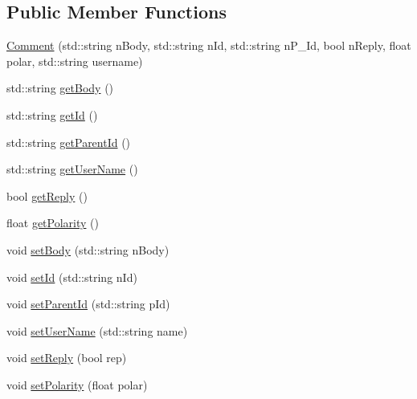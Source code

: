 \subsection*{Public Member Functions}
\begin{DoxyCompactItemize}
\item 
\hyperlink{class_comment_aa72817b1d59ba65d90a924e0ca056bee}{Comment} (std\+::string n\+Body, std\+::string n\+Id, std\+::string n\+P\+\_\+\+Id, bool n\+Reply, float polar, std\+::string username)
\item 
std\+::string \hyperlink{class_comment_acd202bf4ef1b23aa8a11cae4af4b44b4}{get\+Body} ()
\item 
std\+::string \hyperlink{class_comment_ab46d905afeb79abd5caa6434c84020d8}{get\+Id} ()
\item 
std\+::string \hyperlink{class_comment_a2903eea46f56ee796715e4989d1745f1}{get\+Parent\+Id} ()
\item 
std\+::string \hyperlink{class_comment_a192b820f7ad3d8065437436eae4408c5}{get\+User\+Name} ()
\item 
bool \hyperlink{class_comment_a89cfdb81dd327cf01d4f0fbb1d6f3c44}{get\+Reply} ()
\item 
float \hyperlink{class_comment_ab8f639d0d25165885bfbf09d3469f2b0}{get\+Polarity} ()
\item 
void \hyperlink{class_comment_abadebf70476d2ac212154fd52df103e7}{set\+Body} (std\+::string n\+Body)
\item 
void \hyperlink{class_comment_abb43aa20506c1d6cdb54c6b62e2b0d9d}{set\+Id} (std\+::string n\+Id)
\item 
void \hyperlink{class_comment_ac08d6d07afad5663c1d6c5886c7be333}{set\+Parent\+Id} (std\+::string p\+Id)
\item 
void \hyperlink{class_comment_a9e47b4560fb5d4e8e9e254a23622c6d5}{set\+User\+Name} (std\+::string name)
\item 
void \hyperlink{class_comment_ae6c057526fb2d3b789dfe99a0450f134}{set\+Reply} (bool rep)
\item 
void \hyperlink{class_comment_aa980db478aa7780f1094854e4df1bf4c}{set\+Polarity} (float polar)
\end{DoxyCompactItemize}
